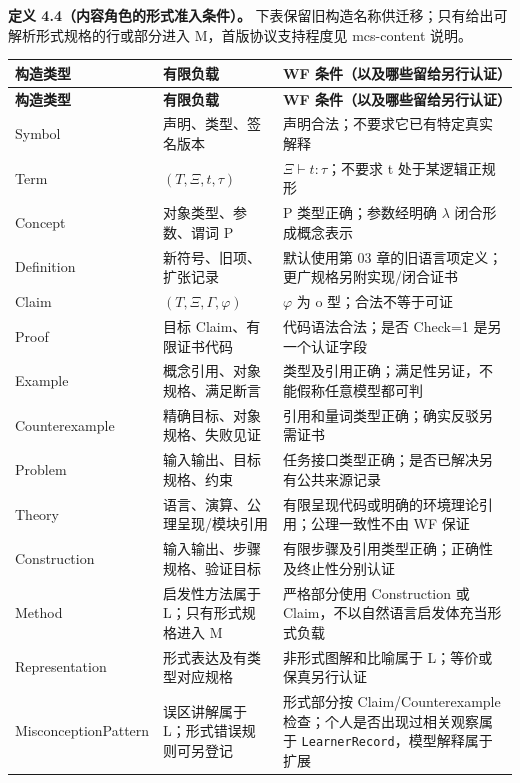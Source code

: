 \documentclass[UTF8,a4paper,zihao=-4,fontset=windows,openany]{ctexbook}
\newcommand{\mcsbrk}{\penalty 200\relax}
\begin{document}
\textbf{定义 4.4（内容角色的形式准入条件）。} 下表保留旧构造名称供迁移；只有给出可解析形式规格的行或部分进入 M，首版协议支持程度见 mcs-content 说明。

\begingroup\small\setlength{\tabcolsep}{4pt}
\begin{longtable}{>{\raggedright\arraybackslash}p{}>{\raggedright\arraybackslash}p{}>{\raggedright\arraybackslash}p{}}
\toprule
\textbf{构造类型} & \textbf{有限负载} & \textbf{WF 条件（以及哪些留给另行认证）} \\
\midrule
\endfirsthead
\toprule
\textbf{构造类型} & \textbf{有限负载} & \textbf{WF 条件（以及哪些留给另行认证）} \\
\midrule
\endhead
\bottomrule
\endfoot
\bottomrule
\endlastfoot
Symbol & 声明、类型、签名版本 & 声明合法；不要求它已有特定真实解释 \\
Term & \((T,\Xi,t,\tau)\) & \(\Xi\vdash t:\tau\)；不要求 t 处于某逻辑正规形 \\
Concept & 对象类型、参数、谓词 P & P 类型正确；参数经明确 \(\lambda\) 闭合形成概念表示 \\
Definition & 新符号、旧项、扩张记录 & 默认使用第 03 章的旧语言项定义；更广规格另附实现/闭合证书 \\
Claim & \((T,\Xi,\Gamma,\varphi)\) & \(\varphi\) 为 o 型；合法不等于可证 \\
Proof & 目标 Claim、有限证书代码 & 代码语法合法；是否 Check=1 是另一个认证字段 \\
Example & 概念引用、对象规格、满足断言 & 类型及引用正确；满足性另证，不能假称任意模型都可判 \\
Counterexample & 精确目标、对象规格、失败见证 & 引用和量词类型正确；确实反驳另需证书 \\
Problem & 输入输出、目标规格、约束 & 任务接口类型正确；是否已解决另有公共来源记录 \\
Theory & 语言、演算、公理呈现/模块引用 & 有限呈现代码或明确的环境理论引用；公理一致性不由 WF 保证 \\
Construction & 输入输出、步骤规格、验证目标 & 有限步骤及引用类型正确；正确性及终止性分别认证 \\
Method & 启发性方法属于 L；只有形式规格进入 M & 严格部分使用 Construction 或 Claim，不以自然语言启发体充当形式负载 \\
Representation & 形式表达及有类型对应规格 & 非形式图解和比喻属于 L；等价或保真另行认证 \\
Miscon\mcsbrk{}ceptio\mcsbrk{}nPatte\mcsbrk{}rn & 误区讲解属于 L；形式错误规则可另登记 & 形式部分按 Claim/Counterexample 检查；个人是否出现过相关观察属于 \texttt{LearnerRecord}，模型解释属于扩展 \\
\end{longtable}
\endgroup
\end{document}
